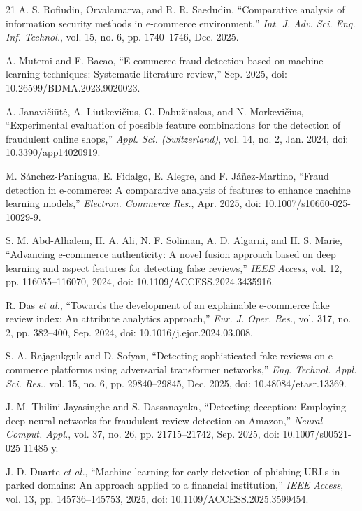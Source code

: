 \begin{thebibliography}{21}
 A. S. Rofiudin, Orvalamarva, and R. R. Saedudin, ``Comparative analysis of information security methods in e-commerce environment,'' \textit{Int. J. Adv. Sci. Eng. Inf. Technol.}, vol. 15, no. 6, pp. 1740--1746, Dec. 2025.

 A. Mutemi and F. Bacao, ``E-commerce fraud detection based on machine learning techniques: Systematic literature review,'' Sep. 2025, doi: 10.26599/BDMA.2023.9020023.

 A. Janavi\v{c}i\=ut\.{e}, A. Liutkevi\v{c}ius, G. Dabu\v{z}inskas, and N. Morkevi\v{c}ius, ``Experimental evaluation of possible feature combinations for the detection of fraudulent online shops,'' \textit{Appl. Sci. (Switzerland)}, vol. 14, no. 2, Jan. 2024, doi: 10.3390/app14020919.

 M. S\'{a}nchez-Paniagua, E. Fidalgo, E. Alegre, and F. J\'{a}\~{n}ez-Martino, ``Fraud detection in e-commerce: A comparative analysis of features to enhance machine learning models,'' \textit{Electron. Commerce Res.}, Apr. 2025, doi: 10.1007/s10660-025-10029-9.

 S. M. Abd-Alhalem, H. A. Ali, N. F. Soliman, A. D. Algarni, and H. S. Marie, ``Advancing e-commerce authenticity: A novel fusion approach based on deep learning and aspect features for detecting false reviews,'' \textit{IEEE Access}, vol. 12, pp. 116055--116070, 2024, doi: 10.1109/ACCESS.2024.3435916.

 R. Das \textit{et al.}, ``Towards the development of an explainable e-commerce fake review index: An attribute analytics approach,'' \textit{Eur. J. Oper. Res.}, vol. 317, no. 2, pp. 382--400, Sep. 2024, doi: 10.1016/j.ejor.2024.03.008.

 S. A. Rajagukguk and D. Sofyan, ``Detecting sophisticated fake reviews on e-commerce platforms using adversarial transformer networks,'' \textit{Eng. Technol. Appl. Sci. Res.}, vol. 15, no. 6, pp. 29840--29845, Dec. 2025, doi: 10.48084/etasr.13369.

 J. M. Thilini Jayasinghe and S. Dassanayaka, ``Detecting deception: Employing deep neural networks for fraudulent review detection on Amazon,'' \textit{Neural Comput. Appl.}, vol. 37, no. 26, pp. 21715--21742, Sep. 2025, doi: 10.1007/s00521-025-11485-y.

 J. D. Duarte \textit{et al.}, ``Machine learning for early detection of phishing URLs in parked domains: An approach applied to a financial institution,'' \textit{IEEE Access}, vol. 13, pp. 145736--145753, 2025, doi: 10.1109/ACCESS.2025.3599454.


\end{thebibliography}
